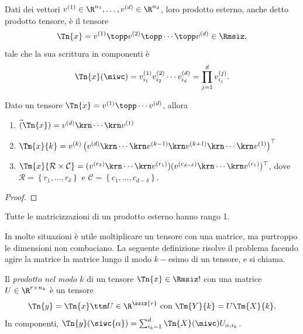 \begin{definition}
  Dati dei vettori $ v^{(1)} \in \R^{n_1}, \ldots, v^{(d)} \in \R^{n_d} $, loro prodotto esterno, anche detto prodotto tensore, è il tensore
  \[
  \Tn{x} = v^{(1)} \topp v^{(2)} \topp \cdots \topp v^{(d)} \in \Rmsiz
  ,\] 
   tale che la sua scrittura in componenti è
     \[
      \Tn{x}(\miwc) = v_{i_1}^{(1)}v_{i_2}^{(2)} \cdots v_{i_d}^{(d)} = \prod_{j=1}^d v_{i_j}^{(j)}
     .\] 
\end{definition}

\begin{lemma}
  Dato un tensore $ \Tn{x} = v^{(1)} \topp \cdots v^{(d)} $, allora
  \begin{enumerate}[label=(\roman*)]
    \item $\vec(\Tn{x}) = v^{(d)} \krn \cdots \krn v^{(1)}$
  \item $ \Tm{x}{k} = v^{(k)}\left( v^{(d)} \krn \cdots \krn v^{(k-1)} \krn v^{(k+1)} \krn \cdots
    \krn v^{(1)} \right)^{\top}$
  \item $\Tm{x}{\mathcal{R} \times \mathcal{C}} = (v^{(r_\delta)} \krn \cdots \krn
    v^{(r_1)})(v^{(c_{d-\delta})} \krn \cdots \krn v^{(c_1)})^{\top}$, dove $\mathcal{R} =\left\{ r_1, \ldots,
    r_\delta \right\} $ e $ \mathcal{C} = \left\{ c_1, \ldots, c_{d-\delta}
  \right\} $.
  \end{enumerate}
\end{lemma}
\begin{proof}
\end{proof}

\begin{remark}
  Tutte le matricizzazioni di un prodotto esterno hanno rango 1.
\end{remark}

In molte situazioni è utile moltiplicare un tensore con una matrice, ma purtroppo le dimensioni non
combaciano. La seguente definizione risolve
il problema facendo agire la matrice la matrice lungo il modo $ k- $esimo di un tensore, e si
chiama.
\begin{definition}
  Il \emph{prodotto nel modo $ k $} di un tensore $ \Tn{x} \in \Rmsiz! $ con una matrice $ U \in
  \R^{r \times n_k} $ è un tensore 
\[
  \Tn{y} = \Tn{x} \ttm U \in \R^{\ssiz{r}} \text{ con } \Tm{Y}{k} = U \Tm{X}{k}
.\] 
In componenti, $ \Tn{y}(\siwc{\alpha}) = \sum_{i_k = 1}^d \Tn{X}(\miwc) U_{\alpha, i_k} $.
\end{definition}


